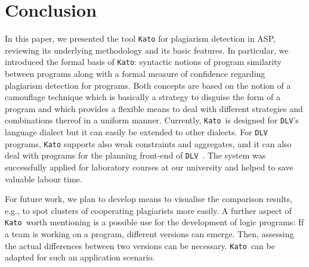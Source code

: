 \documentclass{tlp}
\newcommand{\dlv}{\texttt{DLV}\xspace}
\newcommand{\kato}[0]{\texttt{Kato}\xspace}
\begin{document}
\section{Conclusion }\label{sec:concl}


 In this paper, 
 we presented the tool \kato for plagiarism detection  in ASP, reviewing its underlying  methodology and its
 basic features.
 In particular, we introduced the formal basis of \kato:   syntactic notions of program similarity between programs 
 along with a formal measure of confidence regarding
 plagiarism detection for programs. Both concepts are based on the notion of a camouflage technique which is
 basically a strategy to  disguise
 the form of a program and which provides
 a flexible means to deal with different strategies and combinations thereof in a uniform manner.
 Currently, \kato\ is designed for \dlv's language dialect but it can easily be  extended
 to other dialects.
 For \dlv programs, \kato supports also weak constraints and aggregates, and it can also deal with programs for the  planning front-end of  \dlv~\cite{eiter03}. 
The system was successfully applied for laboratory courses 
at our university and helped to save valuable labour time.  

 For future work, we plan  to develop means to visualise the comparison results, e.g.,  
 to spot clusters of cooperating plagiarists more easily.
 A further  aspect of \kato\ worth mentioning is a possible use for  the development of logic programs:
 If a team is working on a program, different versions can emerge. Then, assessing 
 the actual differences between two versions can be necessary. \kato\ can be adapted for
such an application scenario.
 
\end{document}

